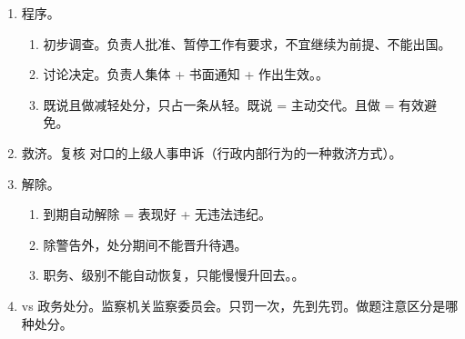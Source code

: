\begin{enumerate}
\begin{enumerate}
                \begin{enumerate}
                  \item 面子罚。职务、职级、级别无影响。警告 6、记过 12、记大过 18。。
                  \item 实质罚。降级 24、撤职 24、开除。
                  \item 以 6 为基，按 6 来加；最高 24，并上 48；重吸收轻。并处上限 48 个月。
                  \item {}。
                  \item {}。
                  \item {}。
                  \item {}。
                \end{enumerate}
          \item 程序。
                \begin{enumerate}
                  \item 初步调查。负责人批准、暂停工作有要求，不宜继续为前提、不能出国。
                  \item 讨论决定。负责人集体 + 书面通知 + 作出生效。。
                  \item 既说且做减轻处分，只占一条从轻。既说 = 主动交代。且做 = 有效避免。
                \end{enumerate}
          \item 救济。复核 \hz 对口的上级人事申诉（行政内部行为的一种救济方式）。
          \item 解除。
                \begin{enumerate}
                  \item 到期自动解除 = 表现好 + 无违法违纪。
                  \item 除警告外，处分期间不能晋升待遇。
                  \item 职务、级别不能自动恢复，只能慢慢升回去。。
                \end{enumerate}
          \item vs 政务处分。监察机关监察委员会。只罚一次，先到先罚。做题注意区分是哪种处分。
        \end{enumerate}
\end{enumerate}
